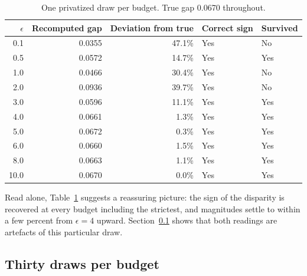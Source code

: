 \documentclass[11pt]{article}
\begin{document}
\begin{table}[H]
\centering
\begin{tabular}{rrrll}
\toprule
$\epsilon$ & Recomputed gap & Deviation from true & Correct sign & Survived \\
\midrule
0.1  & 0.0355 & 47.1\% & Yes & No \\
0.5  & 0.0572 & 14.7\% & Yes & Yes \\
1.0  & 0.0466 & 30.4\% & Yes & No \\
2.0  & 0.0936 & 39.7\% & Yes & No \\
3.0  & 0.0596 & 11.1\% & Yes & Yes \\
4.0  & 0.0661 & 1.3\%  & Yes & Yes \\
5.0  & 0.0672 & 0.3\%  & Yes & Yes \\
6.0  & 0.0660 & 1.5\%  & Yes & Yes \\
8.0  & 0.0663 & 1.1\%  & Yes & Yes \\
10.0 & 0.0670 & 0.0\%  & Yes & Yes \\
\bottomrule
\end{tabular}
\caption{One privatized draw per budget. True gap 0.0670 throughout.}
\label{tab:canonical}
\end{table}

Read alone, Table~\ref{tab:canonical} suggests a reassuring picture: the sign of the disparity is recovered at every budget including the strictest, and magnitudes settle to within a few percent from $\epsilon=4$ upward. Section~\ref{sec:replication} shows that both readings are artefacts of this particular draw.

\subsection{Thirty draws per budget}
\label{sec:replication}
\end{document}
